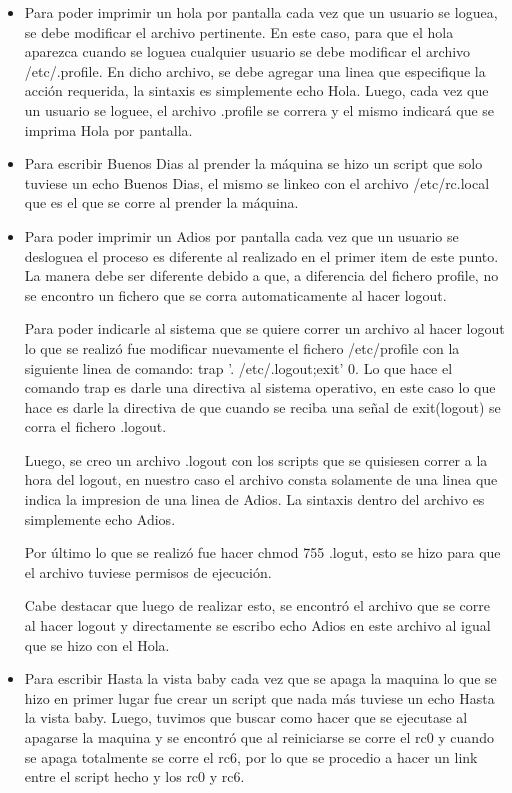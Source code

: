 \documentclass[a4paper, 12pt]{article}
\begin{document}
\begin{itemize}
\item Para poder imprimir un hola por pantalla cada vez que un usuario se loguea, se debe modificar el archivo pertinente. En este caso, para que el hola aparezca cuando se loguea cualquier usuario se debe modificar el archivo /etc/.profile. En dicho archivo, se debe agregar una linea que especifique la acci\'on requerida, la sintaxis es simplemente echo Hola. Luego, cada vez que un usuario se loguee, el archivo .profile se correra y el mismo indicar\'a que se imprima Hola por pantalla.

\item Para escribir Buenos Dias al prender la m\'aquina se hizo un script que solo tuviese un echo Buenos Dias, el mismo se linkeo con el archivo /etc/rc.local que es el que se corre al prender la m\'aquina. 


\item Para poder imprimir un Adios por pantalla cada vez que un usuario se desloguea el proceso es diferente al realizado en el primer item de este punto. La manera debe ser diferente debido a que, a diferencia del fichero profile, no se encontro un fichero que se corra automaticamente al hacer logout. 

Para poder indicarle al sistema que se quiere correr un archivo al hacer logout lo que se realiz\'o fue modificar nuevamente el fichero /etc/profile con la siguiente linea de comando: trap '. /etc/.logout;exit' 0. Lo que hace el comando trap es darle una directiva al sistema operativo, en este caso lo que hace es darle la directiva de que cuando se reciba una se\~{n}al de exit(logout) se corra el fichero .logout.

Luego, se creo un archivo .logout con los scripts que se quisiesen correr a la hora del logout, en nuestro caso el archivo consta solamente de una linea que indica la impresion de una linea de Adios. La sintaxis dentro del archivo es simplemente echo Adios.

Por \'ultimo lo que se realiz\'o fue hacer chmod 755 .logut, esto se hizo para que el archivo tuviese permisos de ejecuci\'on.


Cabe destacar que luego de realizar esto, se encontr\'o el archivo que se corre al hacer logout y directamente se escribo echo Adios en este archivo al igual que se hizo con el Hola.

\item Para escribir Hasta la vista baby cada vez que se apaga la maquina lo que se hizo en primer lugar fue crear un script que nada m\'as tuviese un echo Hasta la vista baby. Luego, tuvimos que buscar como hacer que se ejecutase al apagarse la maquina y se encontr\'o que al reiniciarse se corre el rc0 y cuando se apaga totalmente se corre el rc6, por lo que se procedio a hacer un link entre el script hecho y los rc0 y rc6.


\end{itemize}
\end{document}

